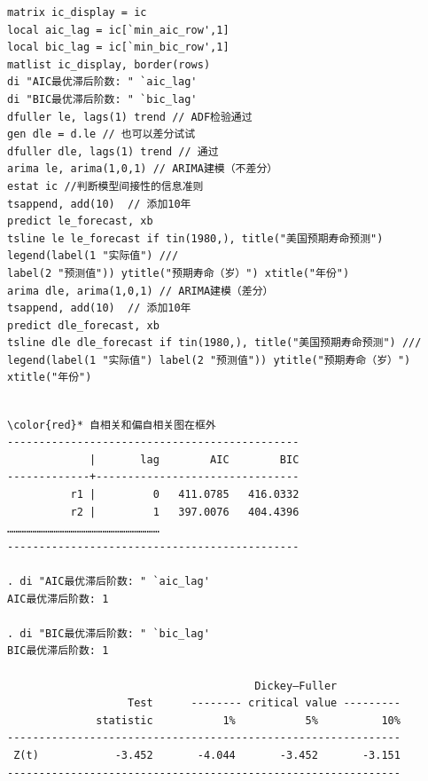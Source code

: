 \begin{tcolorbox}[title=在 Stata 中应用单变量时间序列分析, colback=white, colframe=black, colbacktitle=white, coltitle=black,fonttitle=\bfseries]
\begin{lstlisting}[xleftmargin=2em, commentstyle=\color{black}]
matrix ic_display = ic
local aic_lag = ic[`min_aic_row',1]
local bic_lag = ic[`min_bic_row',1]
matlist ic_display, border(rows)
di "AIC最优滞后阶数: " `aic_lag'
di "BIC最优滞后阶数: " `bic_lag'
dfuller le, lags(1) trend // ADF检验通过
gen dle = d.le // 也可以差分试试
dfuller dle, lags(1) trend // 通过
arima le, arima(1,0,1) // ARIMA建模（不差分）
estat ic //判断模型间接性的信息准则
tsappend, add(10)  // 添加10年
predict le_forecast, xb
tsline le le_forecast if tin(1980,), title("美国预期寿命预测") legend(label(1 "实际值") ///
label(2 "预测值")) ytitle("预期寿命（岁）") xtitle("年份")
arima dle, arima(1,0,1) // ARIMA建模（差分）
tsappend, add(10)  // 添加10年
predict dle_forecast, xb
tsline dle dle_forecast if tin(1980,), title("美国预期寿命预测") ///
legend(label(1 "实际值") label(2 "预测值")) ytitle("预期寿命（岁）") xtitle("年份")

\end{lstlisting}
\vspace{-2em}
\begin{Verbatim}[commandchars=\\\{\},xleftmargin=2em]

\color{red}* 自相关和偏自相关图在框外
----------------------------------------------
             |       lag        AIC        BIC 
-------------+--------------------------------
          r1 |         0   411.0785   416.0332 
          r2 |         1   397.0076   404.4396 
………………………………………………………………
----------------------------------------------

. di "AIC最优滞后阶数: " `aic_lag'
AIC最优滞后阶数: 1

. di "BIC最优滞后阶数: " `bic_lag'
BIC最优滞后阶数: 1

                                       Dickey–Fuller
                   Test      -------- critical value ---------
              statistic           1%           5%          10%
--------------------------------------------------------------
 Z(t)            -3.452       -4.044       -3.452       -3.151
--------------------------------------------------------------


\end{Verbatim}
\end{tcolorbox}

